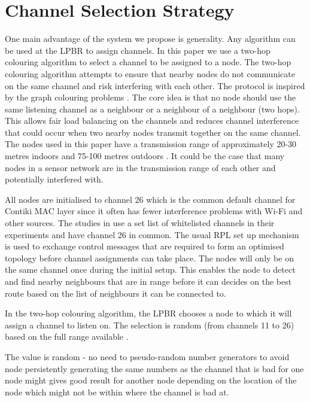 \section{Channel Selection Strategy}
One main advantage of the system we propose is generality. Any algorithm can be used at the LPBR to assign channels. In this paper we use a two-hop colouring algorithm to select a channel to be assigned to a node.
The two-hop colouring algorithm attempts to ensure that nearby nodes do not communicate on the same channel and risk interfering with each other. The protocol is inspired by the graph colouring problems \cite{graphColouring}. The core idea is that no node should use the same listening channel as a neighbour or a neighbour of a neighbour (two hops).
This allows fair load balancing on the channels and reduces channel interference that could occur when two nearby nodes transmit together on the same channel. The nodes used in this paper have a transmission range of approximately 20-30 metres indoors and 75-100 metres outdoors \cite{telosb-datasheet}. It could be the case that many nodes in a sensor network are in the transmission range of each other and potentially interfered with.
 
All nodes are initialised to channel 26 which is the common default channel for Contiki MAC layer since it often has fewer interference problems with Wi-Fi and other sources. The studies in \cite{chrysso, micmac, watteyne} use a set list of whitelisted channels in their experiments and have channel 26 in common. The usual RPL set up mechanism is used to exchange control messages that are required to form an optimised topology before channel assignments can take place. The nodes will only be on the same channel once during the initial setup.
This enables the node to detect and find nearby neighbours that are in range before it can decides on the best route based on the list of neighbours it can be connected to. 
	
In the two-hop colouring algorithm, the LPBR chooses a node to which it will assign a channel to listen on. The selection is random (from channels 11 to 26) based on the full range available \cite{ieee802.15.4}. 

The value is random - no need to pseudo-random number generators to avoid node persistently generating the same numbers as the channel that is bad for one node might gives good result for another node depending on the location of the node which might not be within where the channel is bad at. 

